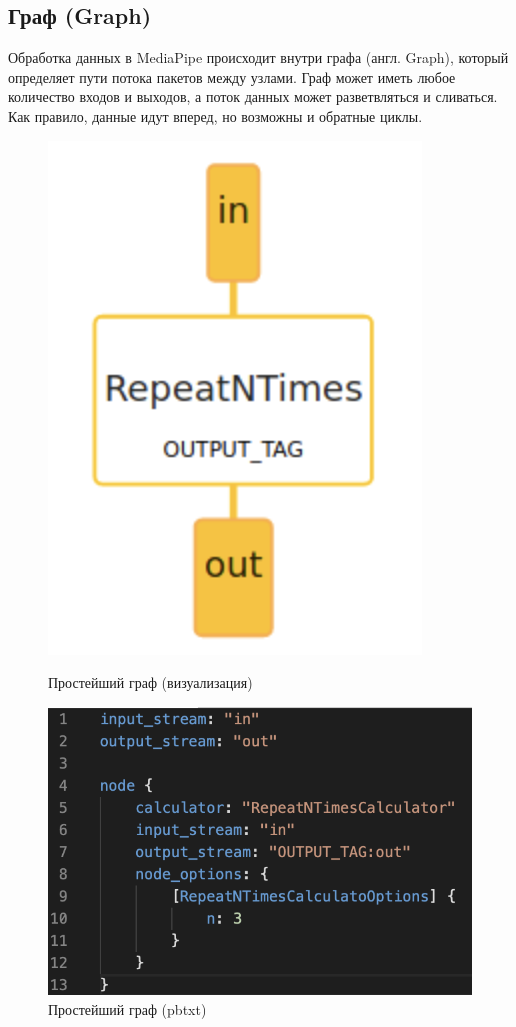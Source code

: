 \documentclass[a4paper,14pt]{extreport}
\begin{document}
        \subsection{Граф (Graph)}
        Обработка данных в MediaPipe происходит внутри графа (англ. Graph), который определяет пути потока пакетов между узлами. Граф может иметь любое количество входов и выходов, а поток данных может разветвляться и сливаться. Как правило, данные идут вперед, но возможны и обратные циклы.
        \begin{figure}[h]
            \begin{center}
                \begin{minipage}[h]{0.3\linewidth}
                    \includegraphics[width=0.5\linewidth]{images-mediapipe/graph.png}
                    \caption{Простейший граф (визуализация)}
                    \label{ris:graph}
                \end{minipage}
                \hfill
                \begin{minipage}[h]{0.5\linewidth}
                    \includegraphics[width=0.7\linewidth]{images-mediapipe/pbtxt.png}
                    \caption{Простейший граф (pbtxt)}
                    \label{ris:pbtxt}
                \end{minipage}
            \end{center}
        \end{figure}
\end{document}
